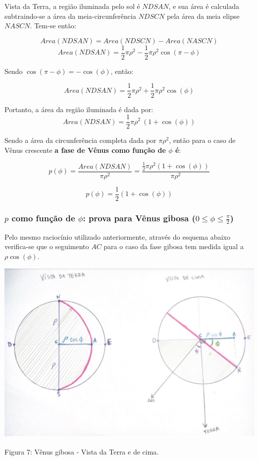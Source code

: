 \documentclass[a4paper, 12pt]{article}
\begin{document}
Vista da Terra, a região iluminada pelo sol é $NDSAN$, e sua área é calculada subtraindo-se a área da meia-circunferência $NDSCN$ pela área da meia elipse $NASCN$. Tem-se então:

$$Area\left(NDSAN\right)=Area\left(NDSCN\right)-Area\left(NASCN\right)$$
$$Area\left(NDSAN\right)=\frac{1}{2}\pi \rho ^2-\frac{1}{2}\pi \rho ^2\cos \left(\pi -\phi \right)$$

Sendo $\cos \left(\pi -\phi \right)=-\cos \left(\phi \right)$, então:

$$Area\left(NDSAN\right)=\frac{1}{2}\pi \rho ^2+\frac{1}{2}\pi \rho ^2\cos \left(\phi \right)$$

Portanto, a área da região iluminada é dada por: 
$$Area\left(NDSAN\right)=\frac{1}{2}\pi \rho ^2\ \left(1+\cos \left(\phi \right)\right)$$

Sendo a área da circunferência completa dada por $\pi \rho ^2$, então para o caso de Vênus crescente \textbf{a fase de Vênus como função de $\phi$ é}:

$$p\left(\phi \right)=\frac{Area\left(NDSAN\right)}{\pi \rho ^2}=\frac{\frac{1}{2}\pi \rho ^2\left(1+\cos \left(\phi \right)\right)}{\pi \rho ^2}$$

$$
    \boxed{p\left(\phi \right)=\frac{1}{2}\left(1+\cos \left(\phi \right)\right)}
$$


\subsubsection{$p$ como função de $\phi$: prova para Vênus gibosa ($0\le \phi \le \frac{\pi }{2}$)}

Pelo mesmo raciocínio utilizado anteriormente, através do esquema abaixo verifica-se que o seguimento $AC$ para o caso da fase gibosa tem medida igual a $\rho \cos \left(\phi \right)$.



\begin{center}
    \includegraphics[width=16cm]{07-gibosa-fase.PNG}
    
    Figura 7: Vênus gibosa - Vista da Terra e de cima.
\end{center}
\end{document}
